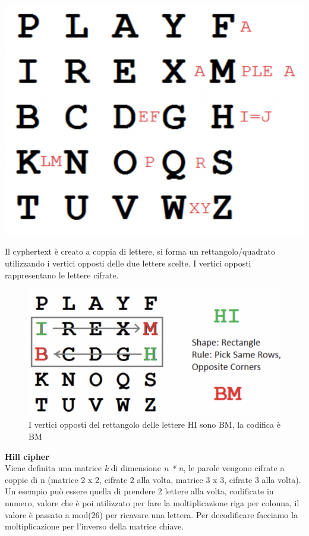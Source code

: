 \documentclass[11pt, oneside]{article}   	%
\begin{document}
\begin{center}
\includegraphics[scale=0.5]{playfair}
\end{center}
Il cyphertext è creato a coppia di lettere, si forma un rettangolo/quadrato utilizzando i vertici opposti delle due lettere scelte. I vertici opposti rappresentano le lettere cifrate.
\begin{figure} [H]
\begin{center}
\includegraphics[scale=0.5]{playfair2}
\caption{I vertici opposti del rettangolo delle lettere HI sono BM, la codifica è BM}
\end{center}
\end{figure}
\noindent \textbf{Hill cipher}\\
Viene definita una matrice \emph{k} di dimensione \emph{n * n}, le parole vengono cifrate a coppie di n (matrice 2 x 2, cifrate 2 alla volta, matrice 3 x 3, cifrate 3 alla volta).\\
Un esempio può essere quella di prendere 2 lettere alla volta, codificate in numero, valore che è poi utilizzato per fare la moltiplicazione riga per colonna, il valore è passato a mod(26) per ricavare una lettera. Per decodificare facciamo la moltiplicazione per l'inverso della matrice chiave.\\
\end{document}
